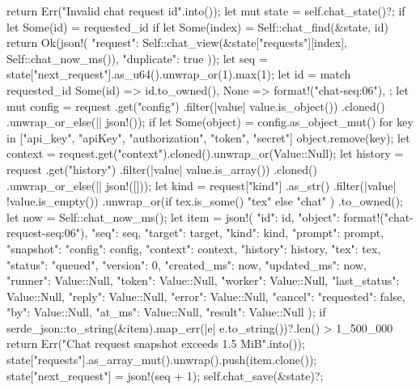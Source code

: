 {{{            {
                return Err("Invalid chat request id".into());
            }
        }
        let mut state = self.chat_state()?;
        if let Some(id) = requested_id {
            if let Some(index) = Self::chat_find(&state, id) {
                return Ok(json!({
                    "request": Self::chat_view(&state["requests"][index], Self::chat_now_ms()),
                    "duplicate": true
                }));
            }
        }
        let seq = state["next_request"].as_u64().unwrap_or(1).max(1);
        let id = match requested_id {
            Some(id) => id.to_owned(),
            None => format!("chat-{seq:06}"),
        };
        let mut config = request
            .get("config")
            .filter(|value| value.is_object())
            .cloned()
            .unwrap_or_else(|| json!({}));
        if let Some(object) = config.as_object_mut() {
            for key in ["api_key", "apiKey", "authorization", "token", "secret"] {
                object.remove(key);
            }
        }
        let context = request.get("context").cloned().unwrap_or(Value::Null);
        let history = request
            .get("history")
            .filter(|value| value.is_array())
            .cloned()
            .unwrap_or_else(|| json!([]));
        let kind = request["kind"]
            .as_str()
            .filter(|value| !value.is_empty())
            .unwrap_or(if tex.is_some() { "tex" } else { "chat" })
            .to_owned();
        let now = Self::chat_now_ms();
        let item = json!({
            "id": id,
            "object": format!("chat-request-{seq:06}"),
            "seq": seq,
            "target": target,
            "kind": kind,
            "prompt": prompt,
            "snapshot": {"config": config, "context": context, "history": history, "tex": tex},
            "status": "queued",
            "version": 0,
            "created_ms": now,
            "updated_ms": now,
            "runner": Value::Null,
            "token": Value::Null,
            "worker": Value::Null,
            "last_status": Value::Null,
            "reply": Value::Null,
            "error": Value::Null,
            "cancel": {"requested": false, "by": Value::Null, "at_ms": Value::Null, "result": Value::Null}
        });
        if serde_json::to_string(&item).map_err(|e| e.to_string())?.len() > 1_500_000 {
            return Err("Chat request snapshot exceeds 1.5 MiB".into());
        }
        state["requests"].as_array_mut().unwrap().push(item.clone());
        state["next_request"] = json!(seq + 1);
        self.chat_save(&state)?;
}}

